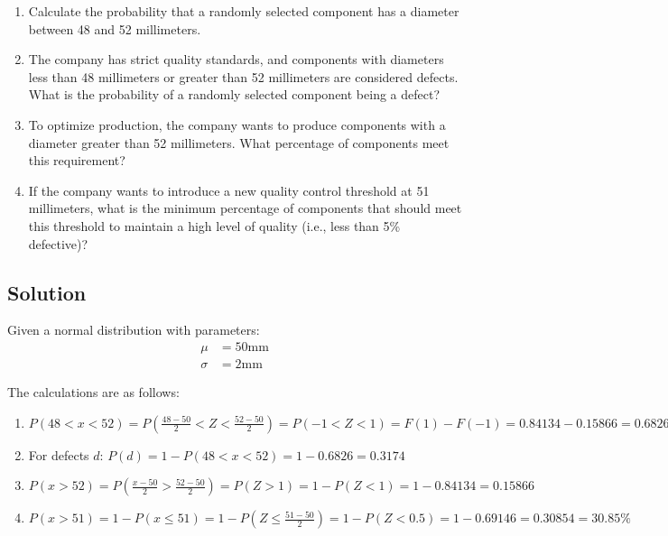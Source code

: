 \documentclass[a4paper, 10pt]{article}
\begin{document}
            \begin{enumerate}[label=(\alph*)]
                \item Calculate the probability that a randomly selected component has a diameter between 48 and 52 millimeters.
                \item The company has strict quality standards, and components with diameters less than 48 millimeters or greater than 52 millimeters are considered defects. What is the probability of a randomly selected component being a defect?
                \item To optimize production, the company wants to produce components with a diameter greater than 52 millimeters. What percentage of components meet this requirement?
                \item If the company wants to introduce a new quality control threshold at 51 millimeters, what is the minimum percentage of components that should meet this threshold to maintain a high level of quality (i.e., less than 5\% defective)?
            \end{enumerate}


        \subsection{Solution}
            Given a normal distribution with parameters:
            \begin{align*}
                \mu &= 50\text{mm} \\
                \sigma &= 2\text{mm}
            \end{align*}

            The calculations are as follows:
            \begin{enumerate}[label=(\alph*)]
                \item $P(48 < x < 52) = P\left(\frac{48-50}{2} < Z < \frac{52-50}{2}\right) = P(-1 < Z < 1) = F(1) - F(-1) = 0.84134 - 0.15866 = 0.6826$
                \item For defects $d$: $P(d) = 1 - P(48 < x < 52) = 1 - 0.6826 = 0.3174$
                \item $P(x > 52) = P\left(\frac{x-50}{2} > \frac{52-50}{2}\right) = P(Z > 1) = 1 - P(Z < 1) = 1 - 0.84134 = 0.15866$
                \item $P(x > 51) = 1 - P(x \leq 51) = 1 - P\left(Z \leq \frac{51-50}{2}\right) = 1 - P(Z < 0.5) = 1 - 0.69146 = 0.30854 = 30.85\%$
            \end{enumerate}
\end{document}
